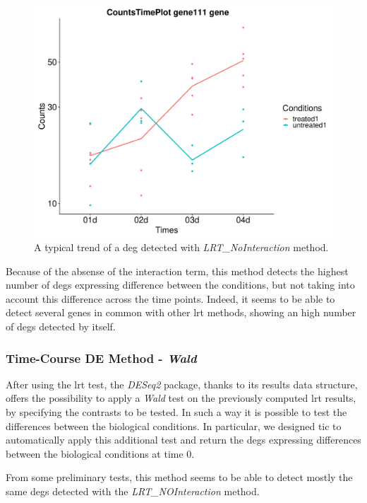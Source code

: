 \begin{figure}[H]
\centering
\includegraphics[width=\textwidth, keepaspectratio]{img/ticorser/de/trends/trend_noint.pdf}
\caption[\gls{tic} LRT\_NOInteraction trend]{A typical trend of a \gls{deg} detected with \textit{LRT\_NoInteraction} method.}
\label{fig:ticlrtnoint}
\end{figure}

Because of the absense of the interaction term, this method detects the highest number of \glspl{deg} expressing difference between the conditions, but not taking into account this difference across the time points.
Indeed, it seems to be able to detect several genes in common with other \gls{lrt} methods, showing an high number of \glspl{deg} detected by itself.

\subsubsection{Time-Course DE Method - \textit{Wald}}

After using the \gls{lrt} test, the \textit{DESeq2} package, thanks to its results data structure, offers the possibility to apply a \textit{Wald} test on the previously computed \gls{lrt} results, by specifying the contrasts to be tested.
In such a way it is possible to test the differences between the biological conditions.
In particular, we designed \gls{tic} to automatically apply this additional test and return the \glspl{deg} expressing differences between the biological conditions at time 0.

From some preliminary tests, this method seems to be able to detect mostly the same \glspl{deg} detected with the \textit{LRT\_NOInteraction} method.

